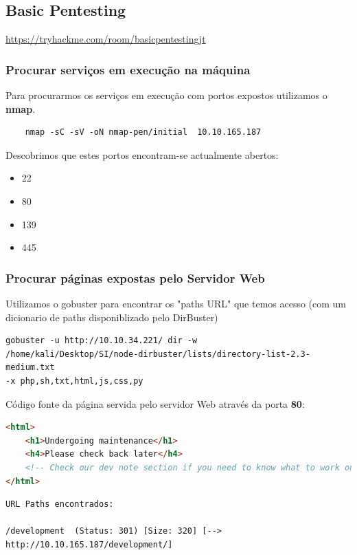 \documentclass[11pt]{article}
\begin{document}
\subsection{Basic Pentesting}

\url{https://tryhackme.com/room/basicpentestingjt}

\subsubsection{Procurar serviços em execução na máquina}

\hspace{0.45cm} Para procurarmos os serviços em execução com portos expostos utilizamos o \textbf{nmap}.

\begin{verbatim}
    nmap -sC -sV -oN nmap-pen/initial  10.10.165.187
\end{verbatim}

Descobrimos que estes portos encontram-se actualmente abertos:
\begin{itemize}
    \item 22
    \item 80 
    \item 139
    \item 445
\end{itemize}

\subsubsection{Procurar páginas expostas pelo Servidor Web}

Utilizamos o gobuster para encontrar os "paths URL" que temos acesso (com um dicionario de paths disponiblizado pelo DirBuster) 

\begin{verbatim}
gobuster -u http://10.10.34.221/ dir -w 
/home/kali/Desktop/SI/node-dirbuster/lists/directory-list-2.3-medium.txt
-x php,sh,txt,html,js,css,py 
\end{verbatim}
Código fonte da página servida pelo servidor Web através da porta \textbf{80}:

\begin{lstlisting}[language=HTML]
<html>
    <h1>Undergoing maintenance</h1>
    <h4>Please check back later</h4>
    <!-- Check our dev note section if you need to know what to work on. -->
</html>
\end{lstlisting}




\begin{lstlisting}
URL Paths encontrados:

/development  (Status: 301) [Size: 320] [--> http://10.10.165.187/development/]
\end{lstlisting}
\end{document}
